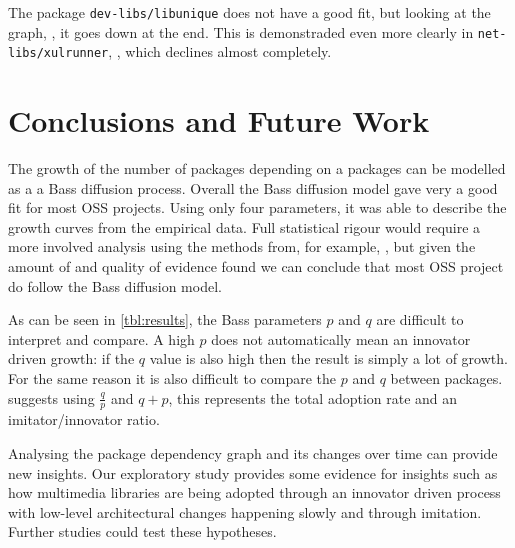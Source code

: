 \documentclass[smallextended,final]{svjour3}
\begin{document}
The package \texttt{dev-libs/libunique} does not have a good fit, but looking at the graph, , it goes down at the end. This is demonstraded even more clearly in \texttt{net-libs/xulrunner}, , which declines almost completely.


\section{Conclusions and Future Work}

The growth of the number of packages depending on a packages can be modelled as a a Bass diffusion process. Overall the Bass diffusion model gave very a good fit for most OSS projects. Using only four parameters, it was able to describe the growth curves from the empirical data. Full statistical rigour would require a more involved analysis using the methods from, for example, \citet{carlos06}, but given the amount of and quality of evidence found we can conclude that most OSS project do follow the Bass diffusion model.

As can be seen in \ref{tbl:results}, the Bass parameters $p$ and $q$ are difficult to interpret and compare. A high $p$ does not automatically mean an innovator driven growth: if the $q$ value is also high then the result is simply a lot of growth. For the same reason it is also difficult to compare the $p$ and $q$ between packages. \citet{mahajan95} suggests using $\frac{q}{p}$ and $q + p$, this represents the total adoption rate and an imitator/innovator ratio.

Analysing the package dependency graph and its changes over time can provide new insights. Our exploratory study provides some evidence for insights such as how multimedia libraries are being adopted through an innovator driven process with low-level architectural changes happening slowly and through imitation. Further studies could test these hypotheses.
\end{document}

